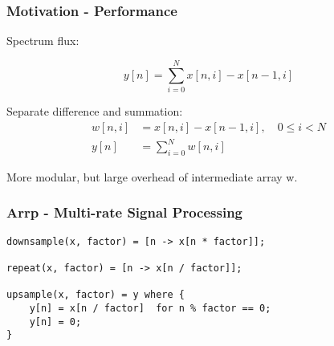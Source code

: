 \documentclass{beamer}
\begin{document}
\begin{frame}
\frametitle{Motivation - Performance}

Spectrum flux:

\begin{equation}
\label{eq:flux}
y[n] = \sum_{i = 0}^{N} x[n, i] - x[n-1, i]
\end{equation}

Separate difference and summation:
\begin{align}
\label{eq:flux}
w[n,i] &= x[n, i] - x[n-1, i], \quad 0 \leq i < N\\
y[n] &= \sum_{i = 0}^{N} w[n, i]
\end{align}

More modular, but large overhead of intermediate array w.

\end{frame}


\begin{frame}[fragile]
\frametitle{Arrp - Multi-rate Signal Processing}

\begin{verbatim}
downsample(x, factor) = [n -> x[n * factor]];

repeat(x, factor) = [n -> x[n / factor]];

upsample(x, factor) = y where {
    y[n] = x[n / factor]  for n % factor == 0;
    y[n] = 0;
}
\end{verbatim}

\end{frame}
\end{document}
